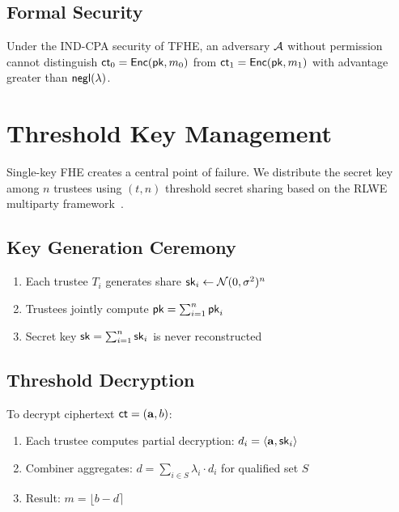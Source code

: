 \documentclass{../shared/luxfhe}
\begin{document}
\subsection{Formal Security}

\begin{theorem}
Under the IND-CPA security of TFHE, an adversary $\mathcal{A}$ without permission cannot distinguish $\mathsf{ct}_0 = \mathsf{Enc}(\mathsf{pk}, m_0)$ from $\mathsf{ct}_1 = \mathsf{Enc}(\mathsf{pk}, m_1)$ with advantage greater than $\mathsf{negl}(\lambda)$.
\end{theorem}

\section{Threshold Key Management}

Single-key FHE creates a central point of failure. We distribute the secret key among $n$ trustees using $(t, n)$ threshold secret sharing based on the RLWE multiparty framework~\cite{mhe-rlwe,threshold-rlwe}.

\subsection{Key Generation Ceremony}

\begin{protocol}
\begin{enumerate}
    \item Each trustee $T_i$ generates share $\mathsf{sk}_i \gets \mathcal{N}(0, \sigma^2)^n$
    \item Trustees jointly compute $\mathsf{pk} = \sum_{i=1}^{n} \mathsf{pk}_i$
    \item Secret key $\mathsf{sk} = \sum_{i=1}^{n} \mathsf{sk}_i$ is never reconstructed
\end{enumerate}
\end{protocol}

\subsection{Threshold Decryption}

To decrypt ciphertext $\mathsf{ct} = (\mathbf{a}, b)$:

\begin{enumerate}
    \item Each trustee computes partial decryption: $d_i = \langle \mathbf{a}, \mathsf{sk}_i \rangle$
    \item Combiner aggregates: $d = \sum_{i \in S} \lambda_i \cdot d_i$ for qualified set $S$
    \item Result: $m = \lfloor b - d \rceil$
\end{enumerate}
\end{document}
